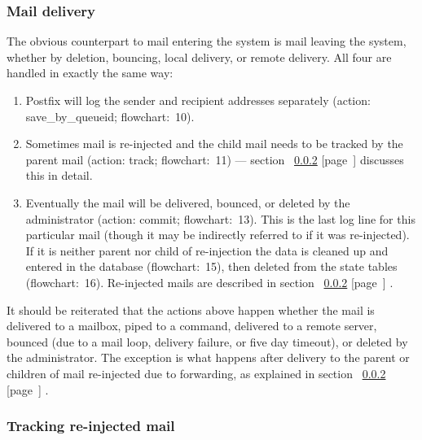 \documentclass[a4paper,12pt,draft]{article}
\newcommand{\refwithpage}[1]{%
    \empty{}\ref{#1} [page~\pageref{#1}]%
}
\begin{document}
\subsubsection{Mail delivery}

\label{mail-delivery}

The obvious counterpart to mail entering the system is mail leaving the
system, whether by deletion, bouncing, local delivery, or remote delivery.
All four are handled in exactly the same way:

\begin{enumerate}

    \item Postfix will log the sender and recipient addresses separately
        (action: save\_by\_queueid; flowchart:~10).

    \item Sometimes mail is re-injected and the child mail needs to be
        tracked by the parent mail (action: track; flowchart:~11) ---
        section~\refwithpage{tracking re-injected mail} discusses this in
        detail.

    \item Eventually the mail will be delivered, bounced, or deleted by the
        administrator (action: commit; flowchart:~13).  This is the last
        log line for this particular mail (though it may be indirectly
        referred to if it was re-injected).  If it is neither parent nor
        child of re-injection the data is cleaned up and entered in the
        database (flowchart:~15), then deleted from the state tables
        (flowchart:~16).  Re-injected mails are described in
        section~\refwithpage{tracking re-injected mail}.

\end{enumerate}

It should be reiterated that the actions above happen whether the mail is
delivered to a mailbox, piped to a command, delivered to a remote server,
bounced (due to a mail loop, delivery failure, or five day timeout), or
deleted by the administrator.  The exception is what happens after delivery
to the parent or children of mail re-injected due to forwarding, as
explained in section~\refwithpage{tracking re-injected mail}.

\subsubsection{Tracking re-injected mail}

\label{tracking re-injected mail}
\end{document}
